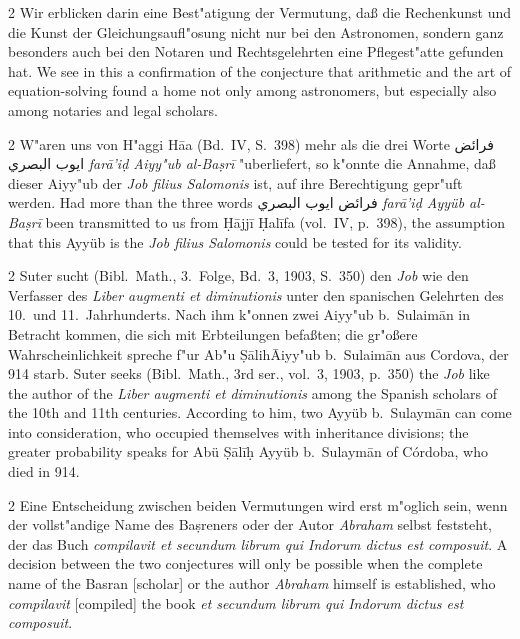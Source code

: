 \documentclass[10pt,a4paper]{article}
\renewcommand{\switchcolumn}{\syncronize\nointerlineskip\columnbreak}
\newcommand{\RL}[1]{\beginR#1\endR}
\newcommand{\ar}[1]{{\arabicfont\RL{#1}}}
\newcommand{\un}[1]{\=#1}
\newcommand{\alf}{\=a}
\begin{document}
\begin{paracol}{2}
Wir erblicken darin eine Best"atigung der Vermutung, da\ss{} die Rechenkunst und die Kunst der Gleichungsaufl"osung nicht nur bei den Astronomen, sondern ganz besonders auch bei den Notaren und Rechtsgelehrten eine Pflegest"atte gefunden hat.
\switchcolumn
We see in this a confirmation of the conjecture that arithmetic and the art of equation-solving found a home not only among astronomers, but especially also among notaries and legal scholars.
\end{paracol}

\begin{paracol}{2}
W"aren uns von H"aggi H\alf{a} (Bd.\ IV, S.\ 398) mehr als die drei Worte \ar{فرائض ايوب البصري} \textit{far\=a'i\d{d} Aiyy"ub al-Ba\d{s}r\=i} "uberliefert, so k"onnte die Annahme, da\ss{} dieser Aiyy"ub der \textit{Job filius Salomonis} ist, auf ihre Berechtigung gepr"uft werden.
\switchcolumn
Had more than the three words \ar{فرائض ايوب البصري} \textit{far\=a'i\d{d} Ayy\"ub al-Ba\d{s}r\={i}} been transmitted to us from \d{H}\=ajj\={i} \d{H}al\={i}fa (vol.\ IV, p.\ 398), the assumption that this Ayy\"ub is the \textit{Job filius Salomonis} could be tested for its validity.
\end{paracol}

\begin{paracol}{2}
Suter sucht (Bibl.\ Math., 3.\ Folge, Bd.\ 3, 1903, S.\ 350) den \textit{Job} wie den Verfasser des \textit{Liber augmenti et diminutionis} unter den spanischen Gelehrten des 10.\ und 11.\ Jahrhunderts. Nach ihm k"onnen zwei Aiyy"ub b.\ Sulaim\=an in Betracht kommen, die sich mit Erbteilungen befa\ss{}ten; die gr"o\ss{}ere Wahrscheinlichkeit spreche f"ur Ab"u \d{S}\=alih\un{} Aiyy"ub b.\ Sulaim\=an aus Cordova, der 914 starb.
\switchcolumn
Suter seeks (Bibl.\ Math., 3rd ser., vol.\ 3, 1903, p.\ 350) the \textit{Job} like the author of the \textit{Liber augmenti et diminutionis} among the Spanish scholars of the 10th and 11th centuries. According to him, two Ayy\"ub b.\ Sulaym\=an can come into consideration, who occupied themselves with inheritance divisions; the greater probability speaks for Ab\"u \d{S}\=al\=i\d{h} Ayy\"ub b.\ Sulaym\=an of C\'ordoba, who died in 914.
\end{paracol}

\begin{paracol}{2}
Eine Entscheidung zwischen beiden Vermutungen wird erst m"oglich sein, wenn der vollst"andige Name des Ba\d{s}reners oder der Autor \textit{Abraham} selbst feststeht, der das Buch \textit{compilavit et secundum librum qui Indorum dictus est composuit}.
\switchcolumn
A decision between the two conjectures will only be possible when the complete name of the Basran [scholar] or the author \textit{Abraham} himself is established, who \textit{compilavit} [compiled] the book \textit{et secundum librum qui Indorum dictus est composuit}.
\end{paracol}
\end{document}
